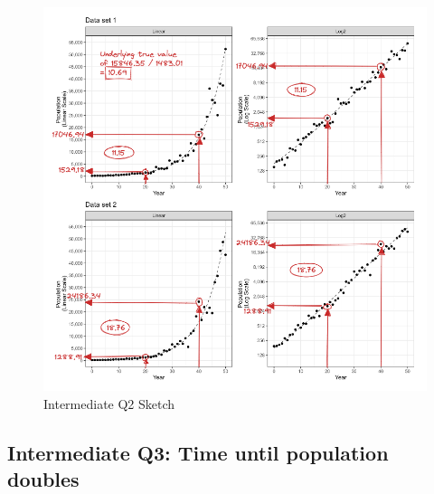 \documentclass[print]{nuthesis}
\begin{document}
\begin{figure}[tbp]

{\centering \includegraphics[width=1\linewidth,]{images/03-estimation/qi2-sketch} 

}

\caption{Intermediate Q2 Sketch}\label{fig:qi2-sketch}
\end{figure}

\hypertarget{intermediate-q3-time-until-population-doubles}{%
\subsection{Intermediate Q3: Time until population doubles}\label{intermediate-q3-time-until-population-doubles}}
\end{document}
